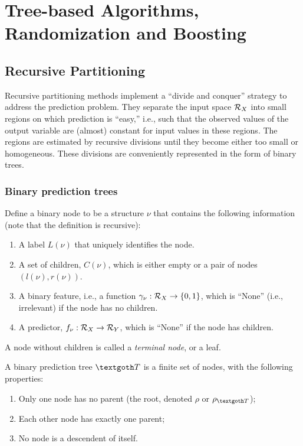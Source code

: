 \chapter[Tree-based algorithms]{Tree-based Algorithms, Randomization and Boosting}
\label{chap:trees}

\section{Recursive Partitioning}

 Recursive partitioning methods implement a ``divide and conquer'' strategy to address the prediction problem.
They separate the input space ${\mathcal R}_X$  into
small regions on which prediction is ``easy,'' i.e., such that the observed values of 
the output variable are (almost) constant for input values in these regions.
The regions  are estimated
by recursive divisions until they become either too small or
homogeneous. These divisions are conveniently represented in the form of binary trees.

\subsection{Binary prediction trees}
 Define a \alert{binary node} to be a structure $\nu$ that contains the following information (note that the definition is recursive):
\begin{enumerate}[label=$\bullet$]
\item A \alert{label} $L(\nu)$ that uniquely identifies the node.
\item A \alert{set of children}, $C(\nu)$, which is either empty or a pair of nodes $(l(\nu), r(\nu))$.
\item A \alert{binary feature}, i.e., a function $\gamma_\nu: {\mathcal R}_X \to \{0,1\}$, which is ``None'' (i.e., irrelevant) if the node has no children.
\item A \alert{predictor}, $f_\nu: {\mathcal R}_X\to {\mathcal R}_Y$, which is ``None'' if the node has children.
\end{enumerate}
 A node without children is called a {\em terminal node}, or a leaf.
\medskip

A \alert{binary prediction tree} $\CTR$  is a finite set of nodes, with the following properties:
\begin{enumerate}[label=(\roman*)]
\item Only one node has no parent (the root, denoted $\rho$ or $\rho_{\CTR}$);
\item Each other node has exactly one parent;
\item  No node is a descendent of itself.
\end{enumerate}

